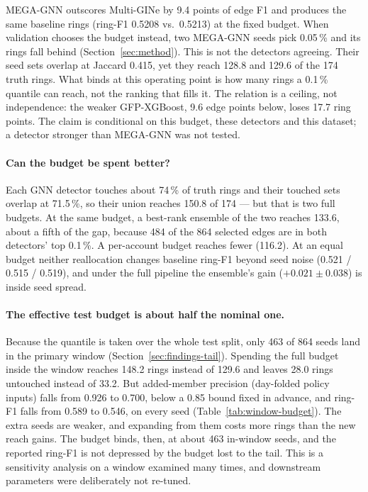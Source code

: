 MEGA-GNN outscores Multi-GINe by 9.4 points of edge F1 and produces the same baseline rings
(ring-F1 0.5208 vs.\ 0.5213) at the fixed budget. When validation chooses the budget instead,
two MEGA-GNN seeds pick 0.05\,\% and its rings fall behind (Section~\ref{sec:method}).
This is not the detectors agreeing. Their seed sets overlap at Jaccard 0.415, yet they reach
128.8 and 129.6 of the 174 truth rings. What binds at this operating point is how many rings a
0.1\,\% quantile can reach, not the ranking that fills it. The relation is a ceiling, not
independence: the weaker GFP-XGBoost, 9.6 edge points below, loses 17.7 ring points.
The claim is conditional on this budget, these detectors and this dataset; a detector
stronger than MEGA-GNN was not tested.

\paragraph{Can the budget be spent better?}
Each GNN detector touches about 74\,\% of truth rings and their touched sets overlap at
71.5\,\%, so their union reaches 150.8 of 174 --- but that is two full budgets. At the same
budget, a best-rank ensemble of the two reaches 133.6, about a fifth of the gap, because 484
of the 864 selected edges are in both detectors' top 0.1\,\%. A per-account budget reaches
fewer (116.2). At an equal budget neither reallocation changes baseline ring-F1 beyond seed
noise (0.521 / 0.515 / 0.519), and under the full pipeline the ensemble's gain
($+0.021 \pm 0.038$) is inside seed spread.

\paragraph{The effective test budget is about half the nominal one.}
Because the quantile is taken over the whole test split, only 463 of 864 seeds land in the
primary window (Section~\ref{sec:findings-tail}). Spending the full budget inside the window
reaches 148.2 rings instead of 129.6 and leaves 28.0 rings untouched instead of 33.2. But
added-member precision (day-folded policy inputs) falls from 0.926 to 0.700, below a 0.85
bound fixed in advance, and
ring-F1 falls from 0.589 to 0.546, on every seed (Table~\ref{tab:window-budget}). The extra
seeds are weaker, and expanding from them costs more rings than the new reach gains. The
budget binds, then, at about 463 in-window seeds, and the reported ring-F1 is not depressed by
the budget lost to the tail. This is a sensitivity analysis on a window examined many times,
and downstream parameters were deliberately not re-tuned.

